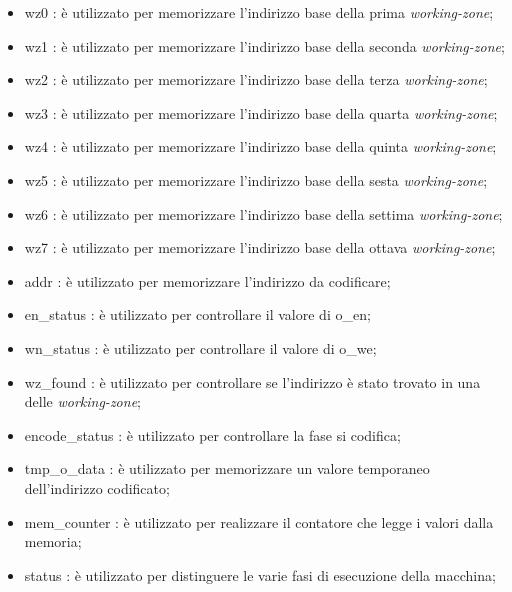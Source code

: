 \documentclass{article}
\begin{document}
\begin{itemize}
\item {\selectfont wz0} : è utilizzato per memorizzare l'indirizzo base della prima \textit{working-zone};
\item {\selectfont wz1} : è utilizzato per memorizzare l'indirizzo base della seconda \textit{working-zone};
\item {\selectfont wz2} : è utilizzato per memorizzare l'indirizzo base della terza \textit{working-zone};
\item {\selectfont wz3} : è utilizzato per memorizzare l'indirizzo base della quarta \textit{working-zone};
\item {\selectfont wz4} : è utilizzato per memorizzare l'indirizzo base della quinta \textit{working-zone};
\item {\selectfont wz5} : è utilizzato per memorizzare l'indirizzo base della sesta \textit{working-zone};
\item {\selectfont wz6} : è utilizzato per memorizzare l'indirizzo base della settima \textit{working-zone};
\item {\selectfont wz7} : è utilizzato per memorizzare l'indirizzo base della ottava \textit{working-zone};
\item {\selectfont addr} : è utilizzato per memorizzare l'indirizzo da codificare;
\item {\selectfont en\_status} : è utilizzato per controllare il valore di {\selectfont o\_en};
\item {\selectfont wn\_status} : è utilizzato per controllare il valore di {\selectfont o\_we};
\item {\selectfont wz\_found} : è utilizzato per controllare se l'indirizzo è stato trovato in una delle \textit{working-zone};
\item {\selectfont encode\_status} : è utilizzato per controllare la fase si codifica;
\item {\selectfont tmp\_o\_data} : è utilizzato per memorizzare un valore temporaneo dell'indirizzo codificato;
\item {\selectfont mem\_counter} : è utilizzato per realizzare il contatore che legge i valori dalla memoria;
\item {\selectfont status} : è utilizzato per distinguere le varie fasi di esecuzione della macchina;
\end{itemize}
\pagebreak
\end{document}
